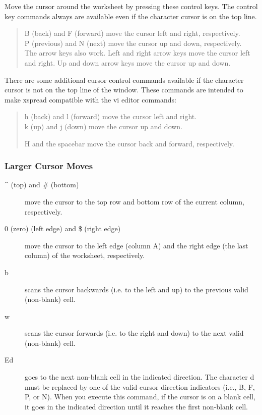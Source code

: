     Move the cursor around the worksheet by pressing these control keys.  The 
control key commands always are available even if the character cursor is on 
the top line.
\begin{quote}
    \ctrl B (back) and \ctrl F (forward) move the cursor left and right, respectively.\\
    \ctrl P (previous) and \ctrl N (next) move the cursor up and down, 
      respectively.\\

    The arrow keys also work. Left and right arrow keys move the cursor
    left and right. Up and down arrow keys move the cursor up and down.
\end{quote}

    There are some additional cursor control commands available if the 
character cursor is not on the top line of the window.  These commands are 
intended to make xspread compatible with the vi editor commands:
\begin{quote}
    h (back) and l (forward) move the cursor left and right.\\
    k (up) and j (down) move the cursor up and down.

    \ctrl H and the spacebar move the cursor back and forward, respectively.
\end{quote}

\subsubsection*{Larger Cursor Moves}
\begin{description}
\item[ \^{ } (top) and \# (bottom)]{ move the cursor to the top row and bottom row of
the current column, respectively.}

    \item[0 (zero) (left edge) and \$ (right edge)]{ move the cursor to the left edge
(column A) and the right edge (the last column) of the worksheet, 
respectively.}

    \item[b]{ scans the cursor backwards (i.e. to the left and up) to the previous 
valid (non-blank) cell.}

    \item[w]{ scans the cursor forwards (i.e. to the right and down) to the next valid 
(non-blank) cell.}

    \item[\ctrl Ed]{ goes to the next non-blank cell in the indicated direction.  The 
character d must be replaced by one of the valid cursor direction indicators 
(i.e., \ctrl B, \ctrl F, \ctrl P, or \ctrl N).  When you execute this 
  command, if the cursor is on 
a blank cell, it goes in the indicated direction until it reaches the first 
non-blank cell.}
\end{description}

